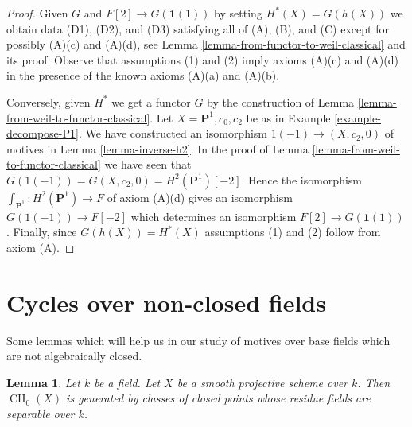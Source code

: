 \documentclass{stacks-project}
\theoremstyle{plain}
\newtheorem{lemma}[subsection]{Lemma}
\theoremstyle{definition}
\theoremstyle{remark}
\numberwithin{equation}{subsection}
\def\CH{\mathop{\mathrm{CH}}\nolimits}
\begin{document}
\begin{proof}
Given $G$ and $F[2] \to G(\mathbf{1}(1))$ by setting $H^*(X) = G(h(X))$
we obtain data (D1), (D2), and (D3) satisfying all of (A), (B), and (C)
except for possibly (A)(c) and (A)(d), see
Lemma \ref{lemma-from-functor-to-weil-classical} and its proof.
Observe that assumptions (1) and (2) imply axioms (A)(c) and (A)(d)
in the presence of the known axioms (A)(a) and (A)(b).

\medskip\noindent
Conversely, given $H^*$ we get a functor $G$ by the construction of
Lemma \ref{lemma-from-weil-to-functor-classical}.
Let $X = \mathbf{P}^1, c_0, c_2$ be as in Example \ref{example-decompose-P1}.
We have constructed an isomorphism $1(-1) \to (X, c_2, 0)$ of motives in
Lemma \ref{lemma-inverse-h2}. In the proof of
Lemma \ref{lemma-from-weil-to-functor-classical} we have seen that
$G(1(-1)) = G(X, c_2, 0) = H^2(\mathbf{P}^1)[-2]$.
Hence the isomorphism $\int_{\mathbf{P}^1} : H^2(\mathbf{P}^1) \to F$
of axiom (A)(d) gives an isomorphism $G(1(-1)) \to F[-2]$ which
determines an isomorphism $F[2] \to G(\mathbf{1}(1))$.
Finally, since $G(h(X)) = H^*(X)$ assumptions (1) and (2)
follow from axiom (A).
\end{proof}











\section{Cycles over non-closed fields}
\label{section-cycles-nonclosed}

\noindent
Some lemmas which will help us in our study of motives
over base fields which are not algebraically closed.

\begin{lemma}
\label{lemma-generated-by-separable}
Let $k$ be a field. Let $X$ be a smooth projective scheme over $k$.
Then $\CH_0(X)$ is generated by classes of closed points whose residue
fields are separable over $k$.
\end{lemma}
\end{document}
